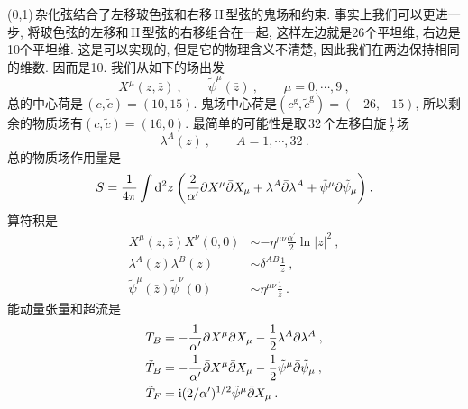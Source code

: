 (0,1)\,杂化弦结合了左移玻色弦和右移\,II\,型弦的鬼场和约束. 事实上我们可以更进一步, 将玻色弦的左移和\,II\,型弦的右移组合在一起, 这样左边就是26个平坦维, 右边是10个平坦维. 这是可以实现的, 但是它的物理含义不清楚, 因此我们在两边保持相同的维数. 因而是10. 我们从如下的场出发
\begin{equation}
    X^{\mu}(z,\bar{z})\:,\qquad \tilde{\psi}^{\mu}(\bar{z}) \:, \qquad \mu = 0,\cdots,9\:, \label{11.2.1}
\end{equation}
总的中心荷是$\,(c,\tilde{c})=(10,15)$. 鬼场中心荷是$(c^{\text{g}},\tilde{c}^{\text{g}})=(-26,-15)$, 所以剩余的物质场有$(c,\tilde{c})=(16,0)$. 最简单的可能性是取\,32\,个左移自旋$\,\frac{1}{2}\,$场
\begin{equation}
    \lambda^{A}(z) \:, \qquad A=1,\cdots,32\:. \label{11.2.2}
\end{equation}
总的物质场作用量是
\begin{equation}
    S=\frac{1}{4\pi} \int \mathrm{d}^{2}z\: \biggl( \frac{2}{\alpha^{\prime}}\partial X^{\mu}\bar{\partial}X_{\mu}
    +\lambda^{A}\bar{\partial}\lambda^{A}+\tilde{\psi}^{\mu}\partial\tilde{\psi}_{\mu}\biggr)\:.\label{11.2.3}
\end{equation}
算符积是
\begin{subequations}
    \begin{align}
        X^{\mu}(z,\bar{z})X^{\nu}(0,0) &\sim -\eta^{\mu\nu} \frac{\alpha^{\prime}}{2} \ln\lvert z\rvert^{2} \:,\label{11.2.4a} \\
        \lambda^{A}(z)\lambda^{B}(z) &\sim \delta^{AB}\frac{1}{z} \:, \label{11.2.4b} \\
        \tilde{\psi}^{\mu}(\bar{z})\tilde{\psi}^{\nu}(0) &\sim \eta^{\mu\nu}\frac{1}{\bar{z}} \:.\label{11.2.4c}
    \end{align}
\end{subequations}
能动量张量和超流是
\begin{subequations}
    \begin{align}
        T_{B} &= -\frac{1}{\alpha^{\prime}}\partial X^{\mu}\partial X_{\mu} -\frac{1}{2}\lambda^{A}\partial\lambda^{A}\:,\label{11.2.5a} \\
        \tilde{T}_{B}&= -\frac{1}{\alpha^{\prime}}\bar{\partial}X^{\mu}\bar{\partial}X_{\mu} 
        -\frac{1}{2}\tilde{\psi}^{\mu}\bar{\partial}\tilde{\psi}_{\mu} \:, \label{11.2.5b} \\
        \tilde{T}_{F}&= \mathrm{i}(2/\alpha^{\prime})^{1/2}\tilde{\psi}^{\mu}\bar{\partial}X_{\mu} \:.\label{11.2.5c}
    \end{align} \label{11.2.5}
\end{subequations}

